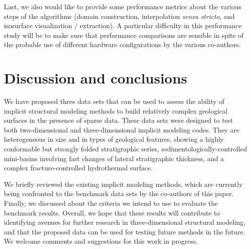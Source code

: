 \documentclass[final]{ring20}
\begin{document}
Last, we also would like to provide some performance metrics about the various steps of the algorithms (domain construction, interpolation \textit{sensu stricto}, and isosurface visualization / extraction). A particular difficulty in this performance study will be to make sure that performance comparisons are sensible in spite of the probable use of different hardware configurations by the various co-authors. 

 


\section*{Discussion and conclusions}
\label{sec:conclu}
We have proposed three data sets that can be used to assess the ability of implicit structural modeling methods to build relatively complex geological surfaces in the presence of sparse data. These data sets were designed to test both two-dimensional and three-dimensional implicit modeling codes. They are heterogeneous in size and in types of geological features, showing a highly conformable but strongly folded stratigraphic series, sedimentologically-controlled mini-basins involving fast changes of lateral stratigraphic thickness, and a complex fracture-controlled hydrothermal surface. 

We briefly reviewed the existing implicit modeling methods, which are currently being confronted to the benchmark data sets by the co-authors of this paper. Finally, we discussed about the criteria we intend to use to evaluate the benchmark results. 
Overall, we hope that these results will contribute to identifying avenues for further research in three-dimensional structural modeling, and that the proposed data can be used for testing future methods in the future. We welcome comments and suggestions for this work in progress. 
\end{document}
